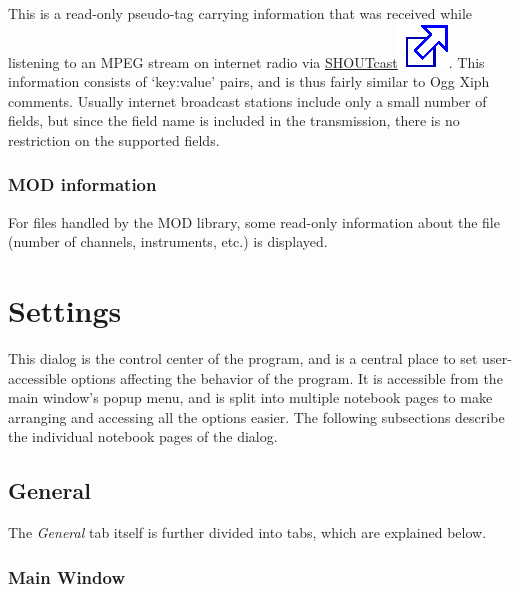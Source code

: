\documentclass[10pt,english]{article}
\begin{document}
\noindent This is a read-only pseudo-tag carrying information that
was received while listening to an MPEG stream on internet
radio via \href{http://www.smackfu.com/stuff/programming/shoutcast.html}{SHOUTcast\includegraphics[scale=0.5]{external.eps}}.
This information consists of `key:value' pairs, and is
thus fairly similar to Ogg Xiph comments. Usually internet
broadcast stations include only a small number of fields,
but since the field name is included in the transmission,
there is no restriction on the supported fields.




\subsubsection{MOD information\label{idp805328}}



\noindent For files handled by the MOD library, some read-only
information about the file (number of channels, instruments,
etc.) is displayed.








\section{Settings\label{idp806800}}



\noindent This dialog is the control center of the program, and is a
central place to set user-accessible options affecting the
behavior of the program. It is accessible from the main window's
popup menu, and is split into multiple notebook pages to make
arranging and accessing all the options easier. The following
subsections describe the individual notebook pages of the
dialog.


\subsection{General\label{idp808416}}



\noindent The \textsl{General} tab itself is further divided into
tabs, which are explained below.


\subsubsection{Main Window\label{idp810240}}
\end{document}

